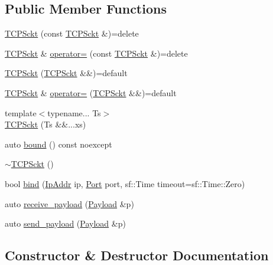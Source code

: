 \subsection*{Public Member Functions}
\begin{DoxyCompactItemize}
\item 
\hyperlink{classnl_1_1Tunnel_1_1TCPSckt_a29b1bd9fd25a56e53e381ff1be86fe03}{T\+C\+P\+Sckt} (const \hyperlink{classnl_1_1Tunnel_1_1TCPSckt}{T\+C\+P\+Sckt} \&)=delete
\item 
\hyperlink{classnl_1_1Tunnel_1_1TCPSckt}{T\+C\+P\+Sckt} \& \hyperlink{classnl_1_1Tunnel_1_1TCPSckt_aaf90f44f317f1ac15317ffde92adc940}{operator=} (const \hyperlink{classnl_1_1Tunnel_1_1TCPSckt}{T\+C\+P\+Sckt} \&)=delete
\item 
\hyperlink{classnl_1_1Tunnel_1_1TCPSckt_a5d910667eef8e9280bd6b69283ac905a}{T\+C\+P\+Sckt} (\hyperlink{classnl_1_1Tunnel_1_1TCPSckt}{T\+C\+P\+Sckt} \&\&)=default
\item 
\hyperlink{classnl_1_1Tunnel_1_1TCPSckt}{T\+C\+P\+Sckt} \& \hyperlink{classnl_1_1Tunnel_1_1TCPSckt_ace7dec76e80abdb8aae151c1b8c2eacc}{operator=} (\hyperlink{classnl_1_1Tunnel_1_1TCPSckt}{T\+C\+P\+Sckt} \&\&)=default
\item 
{\footnotesize template$<$typename... Ts$>$ }\\\hyperlink{classnl_1_1Tunnel_1_1TCPSckt_ae1aece707dece57b1c851ce1f810cb04}{T\+C\+P\+Sckt} (Ts \&\&...xs)
\item 
auto \hyperlink{classnl_1_1Tunnel_1_1TCPSckt_a67bed7db53908da2567771be4e3b7ac7}{bound} () const  noexcept
\item 
\hyperlink{classnl_1_1Tunnel_1_1TCPSckt_aaeb3c7bb631713a11dfb73988f6ef245}{$\sim$\+T\+C\+P\+Sckt} ()
\item 
bool \hyperlink{classnl_1_1Tunnel_1_1TCPSckt_a4d54d4f309eb19a780d0ce2bb39d81e9}{bind} (\hyperlink{namespacenl_a62ea075e0e667b99f002ec1af2b5b348}{Ip\+Addr} ip, \hyperlink{namespacenl_a12899c87e239db66809da0a71fcc9129}{Port} port, sf\+::\+Time timeout=sf\+::\+Time\+::\+Zero)
\item 
auto \hyperlink{classnl_1_1Tunnel_1_1TCPSckt_a6df7a0e8eee7129126ac4a67202bdbf8}{receive\+\_\+payload} (\hyperlink{structnl_1_1Payload}{Payload} \&p)
\item 
auto \hyperlink{classnl_1_1Tunnel_1_1TCPSckt_a4071939a50f27d9d7231904b80bc80ee}{send\+\_\+payload} (\hyperlink{structnl_1_1Payload}{Payload} \&p)
\end{DoxyCompactItemize}


\subsection{Constructor \& Destructor Documentation}
\hypertarget{classnl_1_1Tunnel_1_1TCPSckt_a29b1bd9fd25a56e53e381ff1be86fe03}{}
